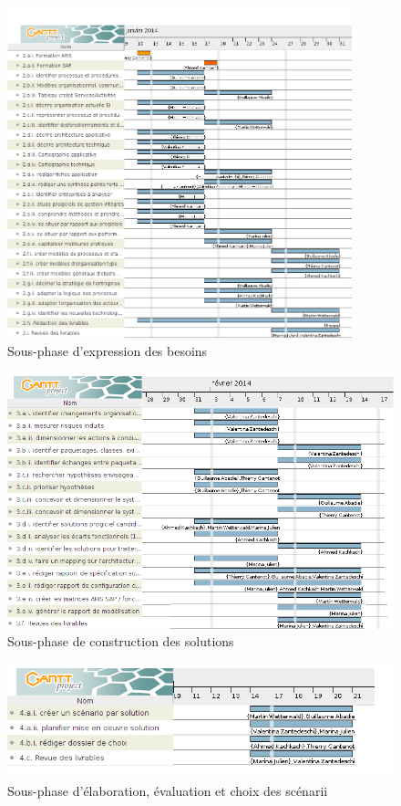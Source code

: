 \begin{figure}[h]
    \centering
    \includegraphics[width=100mm]{images/SPIE_besoins.png}
    \caption{Sous-phase d'expression des besoins}
    \label{diagram:si_map}
\end{figure}

\begin{figure}[h]
    \centering
    \includegraphics[width=150mm]{images/SPIE_3.png}
    \caption{Sous-phase de construction des solutions}
    \label{diagram:si_map}
\end{figure}

\begin{figure}[h]
    \centering
    \includegraphics[scale=0.65]{images/SPIE_4.png}
    \caption{Sous-phase d'élaboration, évaluation et choix des scénarii}
    \label{diagram:si_map}
\end{figure}

